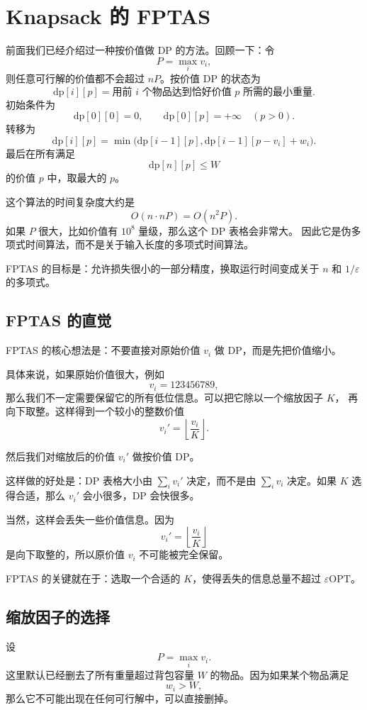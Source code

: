 \documentclass[UTF8,openany,12pt]{ctexbook}
\theoremstyle{remark}
\newcommand{\OPT}{\mathrm{OPT}}
\begin{document}
\section{Knapsack 的 FPTAS}

前面我们已经介绍过一种按价值做 DP 的方法。回顾一下：令
\[
  P=\max_i v_i,
\]
则任意可行解的价值都不会超过 $nP$。按价值 DP 的状态为
\[
  \text{dp}[i][p]
  =
  \text{用前 } i \text{ 个物品达到恰好价值 } p \text{ 所需的最小重量}.
\]
初始条件为
\[
  \text{dp}[0][0]=0,
  \qquad
  \text{dp}[0][p]=+\infty \quad (p>0).
\]
转移为
\[
  \text{dp}[i][p]
  =
  \min\bigl(
    \text{dp}[i-1][p],
    \text{dp}[i-1][p-v_i]+w_i
  \bigr).
\]
最后在所有满足
\[
  \text{dp}[n][p]\le W
\]
的价值 $p$ 中，取最大的 $p$。

这个算法的时间复杂度大约是
\[
  O(n\cdot nP)=O(n^2P).
\]
如果 $P$ 很大，比如价值有 $10^8$ 量级，那么这个 DP 表格会非常大。
因此它是伪多项式时间算法，而不是关于输入长度的多项式时间算法。

FPTAS 的目标是：允许损失很小的一部分精度，换取运行时间变成关于
$n$ 和 $1/\varepsilon$ 的多项式。

\subsection{FPTAS 的直觉}

FPTAS 的核心想法是：不要直接对原始价值 $v_i$ 做 DP，而是先把价值缩小。

具体来说，如果原始价值很大，例如
\[
  v_i=123456789,
\]
那么我们不一定需要保留它的所有低位信息。可以把它除以一个缩放因子 $K$，
再向下取整。这样得到一个较小的整数价值
\[
  v_i'=\left\lfloor \frac{v_i}{K}\right\rfloor.
\]

然后我们对缩放后的价值 $v_i'$ 做按价值 DP。

这样做的好处是：DP 表格大小由 $\sum_i v_i'$ 决定，而不是由
$\sum_i v_i$ 决定。如果 $K$ 选得合适，那么 $v_i'$ 会小很多，DP 会快很多。

当然，这样会丢失一些价值信息。因为
\[
  v_i'
  =
  \left\lfloor \frac{v_i}{K}\right\rfloor
\]
是向下取整的，所以原价值 $v_i$ 不可能被完全保留。

FPTAS 的关键就在于：选取一个合适的 $K$，使得丢失的信息总量不超过
$\varepsilon\OPT$。

\subsection{缩放因子的选择}

设
\[
  P=\max_i v_i.
\]
这里默认已经删去了所有重量超过背包容量 $W$ 的物品。因为如果某个物品满足
\[
  w_i>W,
\]
那么它不可能出现在任何可行解中，可以直接删掉。
\end{document}
